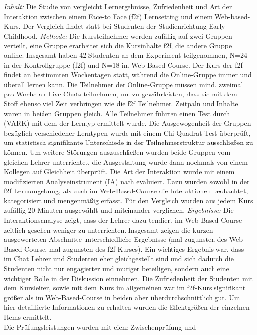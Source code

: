 \documentclass[12pt, bibliography=totoc]{scrartcl}
\begin{document}
\emph{Inhalt:} Die Studie von \textcite{mentzer2007two} vergleicht
Lernergebnisse, Zufriedenheit und Art der Interaktion zwischen einem
Face-to Face (f2f) Lernsetting und einem Web-based-Kurs. Der Vergleich
findet statt bei Studenten der Studienrichtung Early Childhood.
\emph{Methode:} Die Kursteilnehmer werden zufällig auf zwei Gruppen
verteilt, eine Gruppe erarbeitet sich die Kursinhalte f2f, die andere
Gruppe online. Insgesamt haben 42 Studenten an dem Experiment
teilgenommen, N=24 in der Kontrollgruppe (f2f) und N=18 im
Web-Based-Course. Der Kurs der f2f findet an bestimmten Wochentagen
statt, während die Online-Gruppe immer und überall lernen kann. Die
Teilnehmer der Online-Gruppe müssen mind. zweimal pro Woche an
Live-Chats teilnehmen, um zu gewährleisten, dass sie mit dem Stoff
ebenso viel Zeit verbringen wie die f2f Teilnehmer. Zeitpaln und Inhalte
waren in beiden Gruppen gleich. Alle Teilnehmer führten einen Test durch
(VARK) mit dem der Lerntyp ermittelt wurde. Die Ausgewogenheit der
Gruppen bezüglich verschiedener Lerntypen wurde mit einem
Chi-Quadrat-Test überprüft, um statistisch signifikante Unterschiede in
der Teilnehmerstruktur ausschließen zu können. Um weitere Störungen
auszuschließen wurden beide Gruppen vom gleichen Lehrer unterrichtet,
die Ausgestaltung wurde dann nochmals von einem Kollegen auf Gleichheit
überprüft. Die Art der Interaktion wurde mit einem modifizierten
Analyseinstrument (IA) nach \textcite{Flanders1961} evaluiert. Dazu
wurden sowohl in der f2f Lernumgebung, als auch im Web-Based-Course die
Interaktionen beobachtet, kategorisiert und mengenmäßig erfasst. Für den
Vergleich wurden aus jedem Kurs zufällig 20 Minuten ausgewählt und
miteinander verglichen. \emph{Ergebnisse:} Die Interaktionsanalyse
zeigt, dass der Lehrer dazu tendiert im Web-Based-Course zeitlich
gesehen weniger zu unterrichten. Insgesamt zeigen die kurzen
ausgewerteten Abschnitte unterschiedliche Ergebnisse (mal zugunsten des
Web-Based-Course, mal zugunsten des f2f-Kurses). Ein wichtiges Ergebnis
war, dass im Chat Lehrer und Studenten eher gleichgestellt sind und sich
dadurch die Studenten nicht nur engagierter und mutiger beteiligen,
sondern auch eine wichtiger Rolle in der Diskussion einnehmen. Die
Zufriedenheit der Studenten mit dem Kursleiter, sowie mit dem Kurs im
allgemeinen war im f2f-Kurs signifikant größer als im Web-Based-Course
in beiden aber überdurchschnittlich gut. Um hier detaillierte
Informationen zu erhalten wurden die Effektgrößen der einzelnen Items
ermittelt.\\Die Prüfungsleistungen wurden mit eienr Zwischenprüfung und
\end{document}
